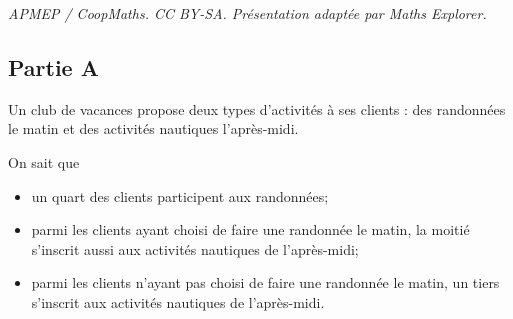 \documentclass[10pt]{article}
\begin{document}
\noindent\textit{APMEP / CoopMaths. CC BY-SA. Présentation adaptée par Maths Explorer.}\par\medskip
\subsection*{Partie A}
Un club de vacances propose deux types d'activités à ses clients : des randonnées le matin et des activités nautiques l'après-midi.

\vspace{5mm}
On sait que
\begin{itemize}[label=$\bullet$]
	\item un quart des clients participent aux randonnées;

	\item parmi les clients ayant choisi de faire une randonnée le matin, la moitié s'inscrit aussi aux activités nautiques de l'après-midi;

	\item parmi les clients n'ayant pas choisi de faire une randonnée le matin, un tiers s'inscrit aux activités nautiques de l'après-midi.
\end{itemize}
\end{document}
